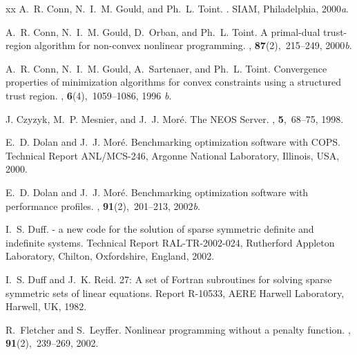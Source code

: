 \documentclass[acmtocl,acmnow]{acmtrans2m}
\begin{document}
\begin{thebibliography}{xx}
A.~R. Conn, N.~I.~M. Gould, and Ph.~L. Toint.
.
\newblock SIAM, Philadelphia, 2000{\em a}.

A.~R. Conn, N.~I.~M. Gould, D.~Orban, and Ph.~L. Toint.
\newblock A primal-dual trust-region algorithm for non-convex nonlinear
  programming.
, {\bf 87}(2),~215--249, 2000{\em b}.

A.~R. Conn, N.~I.~M. Gould, A.~Sartenaer, and Ph.~L. Toint.
\newblock Convergence properties of minimization algorithms for convex
  constraints using a structured trust region.
, {\bf 6}(4),~1059--1086, 1996{\em
  b}.

J. Czyzyk, M.~P. Mesnier, and J.~J. Mor\'{e}.
\newblock The {NEOS} {S}erver.
, {\bf
  5},~68--75, 1998.

E.~D. Dolan and J.~J. Mor\'{e}.
\newblock Benchmarking optimization software with {COPS}.
\newblock Technical Report ANL/MCS-246, Argonne National Laboratory, Illinois,
  USA, 2000.

E.~D. Dolan and J.~J. Mor\'{e}.
\newblock Benchmarking optimization software with performance profiles.
, {\bf 91}(2),~201--213, 2002{\em b}.

I.~S. Duff.
 - a new code for the solution of sparse symmetric 
  definite and indefinite systems.
\newblock Technical Report RAL-TR-2002-024, Rutherford Appleton Laboratory,
  Chilton, Oxfordshire, England, 2002.

I.~S. Duff and J.~K. Reid.
27: A set of {F}ortran subroutines for solving sparse symmetric
  sets of linear equations.
\newblock Report R-10533, {AERE} {H}arwell Laboratory, Harwell, UK, 1982.

R.~Fletcher and S.~Leyffer.
\newblock Nonlinear programming without a penalty function.
, {\bf 91}(2),~239--269, 2002.


\end{thebibliography}
\end{document}
